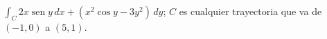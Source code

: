 \item $\int_C 2x \operatorname{sen} y \, dx + (x^2 \cos y - 3y^2) \, dy$; $C$ es cualquier trayectoria que va de $(-1, 0)$ a $(5, 1)$.
